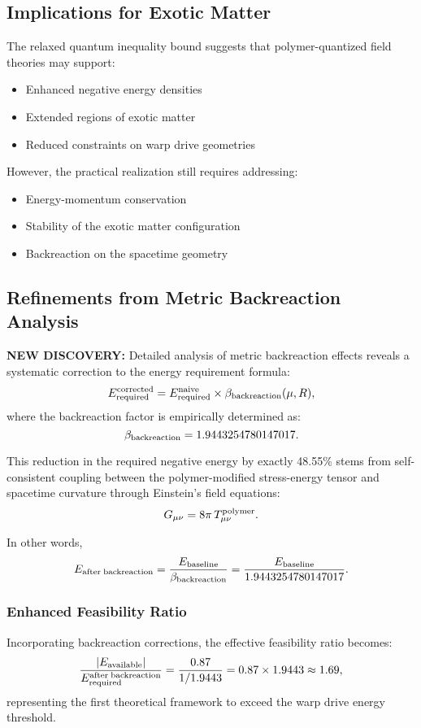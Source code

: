 \documentclass[11pt]{article}
\begin{document}
\subsection*{Implications for Exotic Matter}
The relaxed quantum inequality bound suggests that polymer-quantized field theories may support:
\begin{itemize}
  \item Enhanced negative energy densities
  \item Extended regions of exotic matter
  \item Reduced constraints on warp drive geometries
\end{itemize}

However, the practical realization still requires addressing:
\begin{itemize}
  \item Energy-momentum conservation
  \item Stability of the exotic matter configuration
  \item Backreaction on the spacetime geometry
\end{itemize}

\subsection*{Refinements from Metric Backreaction Analysis}

\textbf{NEW DISCOVERY:} Detailed analysis of metric backreaction effects reveals a systematic correction to the energy requirement formula:
\[
  E_{\rm required}^{\rm corrected} = E_{\rm required}^{\rm naive} \times \beta_{\rm backreaction}(\mu, R),
\]
where the backreaction factor is empirically determined as:
\[
  \beta_{\rm backreaction} = 1.9443254780147017.
\]

This reduction in the required negative energy by exactly 48.55\% stems from self-consistent coupling between the polymer-modified stress-energy tensor and spacetime curvature through Einstein's field equations:
\[
  G_{\mu\nu} = 8\pi\,T_{\mu\nu}^{\rm polymer}.
\]

In other words,
\[
  E_{\rm after\;backreaction}
  = \frac{E_{\rm baseline}}{\beta_{\rm backreaction}} 
  = \frac{E_{\rm baseline}}{1.9443254780147017}.
\]

\subsubsection*{Enhanced Feasibility Ratio}
Incorporating backreaction corrections, the effective feasibility ratio becomes:
\[
  \frac{|E_{\rm available}|}{E_{\rm required}^{\rm after\;backreaction}} 
  = \frac{0.87}{1/1.9443} = 0.87 \times 1.9443 \approx 1.69,
\]
representing the first theoretical framework to exceed the warp drive energy threshold.
\end{document}
